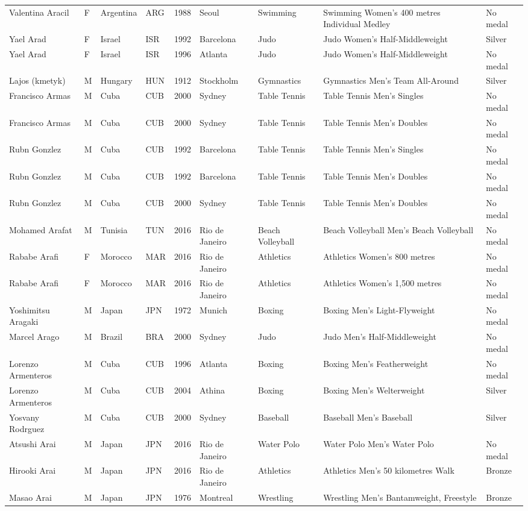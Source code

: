 \documentclass{article}%
\begin{document}
\begin{longtable}{l l l l l l l l l}
Valentina Aracil&F&Argentina&ARG&1988&Seoul&Swimming&Swimming Women's 400 metres Individual Medley&No medal\\%
Yael Arad&F&Israel&ISR&1992&Barcelona&Judo&Judo Women's Half{-}Middleweight&Silver\\%
Yael Arad&F&Israel&ISR&1996&Atlanta&Judo&Judo Women's Half{-}Middleweight&No medal\\%
Lajos (kmetyk)&M&Hungary&HUN&1912&Stockholm&Gymnastics&Gymnastics Men's Team All{-}Around&Silver\\%
Francisco Armas&M&Cuba&CUB&2000&Sydney&Table Tennis&Table Tennis Men's Singles&No medal\\%
Francisco Armas&M&Cuba&CUB&2000&Sydney&Table Tennis&Table Tennis Men's Doubles&No medal\\%
Rubn Gonzlez&M&Cuba&CUB&1992&Barcelona&Table Tennis&Table Tennis Men's Singles&No medal\\%
Rubn Gonzlez&M&Cuba&CUB&1992&Barcelona&Table Tennis&Table Tennis Men's Doubles&No medal\\%
Rubn Gonzlez&M&Cuba&CUB&2000&Sydney&Table Tennis&Table Tennis Men's Doubles&No medal\\%
Mohamed Arafat&M&Tunisia&TUN&2016&Rio de Janeiro&Beach Volleyball&Beach Volleyball Men's Beach Volleyball&No medal\\%
Rababe Arafi&F&Morocco&MAR&2016&Rio de Janeiro&Athletics&Athletics Women's 800 metres&No medal\\%
Rababe Arafi&F&Morocco&MAR&2016&Rio de Janeiro&Athletics&Athletics Women's 1,500 metres&No medal\\%
Yoshimitsu Aragaki&M&Japan&JPN&1972&Munich&Boxing&Boxing Men's Light{-}Flyweight&No medal\\%
Marcel Arago&M&Brazil&BRA&2000&Sydney&Judo&Judo Men's Half{-}Middleweight&No medal\\%
Lorenzo Armenteros&M&Cuba&CUB&1996&Atlanta&Boxing&Boxing Men's Featherweight&No medal\\%
Lorenzo Armenteros&M&Cuba&CUB&2004&Athina&Boxing&Boxing Men's Welterweight&Silver\\%
Yosvany Rodrguez&M&Cuba&CUB&2000&Sydney&Baseball&Baseball Men's Baseball&Silver\\%
Atsushi Arai&M&Japan&JPN&2016&Rio de Janeiro&Water Polo&Water Polo Men's Water Polo&No medal\\%
Hirooki Arai&M&Japan&JPN&2016&Rio de Janeiro&Athletics&Athletics Men's 50 kilometres Walk&Bronze\\%
Masao Arai&M&Japan&JPN&1976&Montreal&Wrestling&Wrestling Men's Bantamweight, Freestyle&Bronze\\%

\end{longtable}
\end{document}
